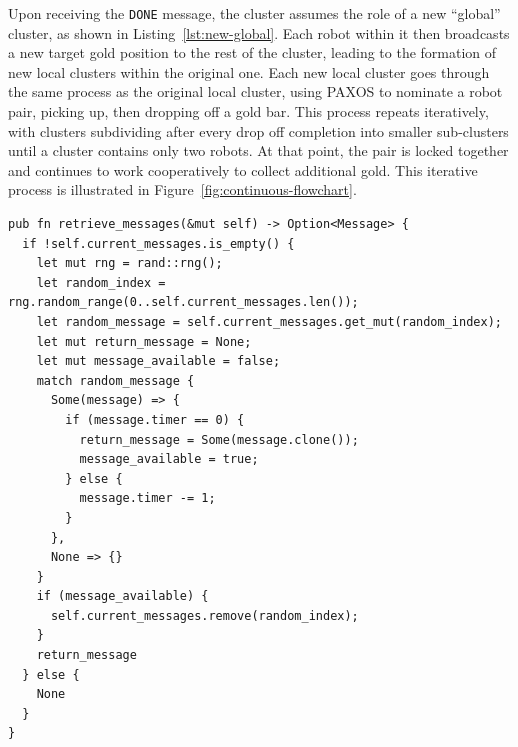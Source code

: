 \documentclass[12pt,a4paper]{article}
\begin{document}
Upon receiving the \texttt{DONE} message, the cluster assumes the role of a new “global” cluster, as shown in Listing~\ref{lst:new-global}. Each robot within it then broadcasts a new target gold position to the rest of the cluster, leading to the formation of new local clusters within the original one. Each new local cluster goes through the same process as the original local cluster, using PAXOS to nominate a robot pair, picking up, then dropping off a gold bar. This process repeats iteratively, with clusters subdividing after every drop off completion into smaller sub-clusters until a cluster contains only two robots. At that point, the pair is locked together and continues to work cooperatively to collect additional gold. This iterative process is illustrated in Figure~\ref{fig:continuous-flowchart}.
 
\begin{lstlisting}[float, caption={New message retrieval mechanism}, label={lst:new-global}]
pub fn retrieve_messages(&mut self) -> Option<Message> {
  if !self.current_messages.is_empty() {
    let mut rng = rand::rng();
    let random_index = rng.random_range(0..self.current_messages.len());
    let random_message = self.current_messages.get_mut(random_index);
    let mut return_message = None;
    let mut message_available = false;
    match random_message {
      Some(message) => {
        if (message.timer == 0) {
          return_message = Some(message.clone());
          message_available = true;
        } else {
          message.timer -= 1;
        }
      },
      None => {}
    }
    if (message_available) {
      self.current_messages.remove(random_index);
    }
    return_message
  } else {
    None
  }
}
\end{lstlisting}
\end{document}
